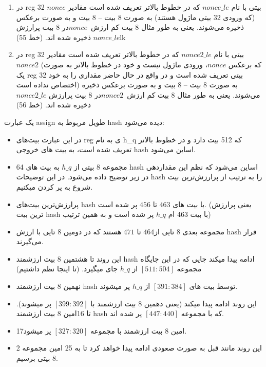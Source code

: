 \begin{enumerate}
	\item در reg 32 بیتی با نام $nonce\_le$ که در خطوط بالاتر تعریف شده است مقادیر $nonce$ (که ورودی 32 بیتی ماژول هستند) به صورت 8 بیت – 8 بیت و به صورت برعکس ذخیره می‌شوند. یعنی به طور مثال 8 بیت کم ارزش\  $nonce$در 8 بیت پرارزش $nonce\_le$ ذخیره شده اند. (خط 55)lk
	      
	\item در reg 32 بیتی با نام $nonce2\_le$ که در خطوط بالاتر تعریف شده است مقادیر $nonce2$ (که برعکس $nonce$، ورودی ماژول نیست و خود در خطوط بالاتر به صورت یک reg 32 بیتی تعریف شده است و در واقع در حال حاضر مقداری را به خود اختصاص نداده است) به صورت 8 بیت – 8 بیت و به صورت برعکس ذخیره می‌شوند. یعنی به طور مثال 8 بیت کم ارزش\  $nonce2$در 8 بیت پرارزش  $nonce2\_le$ ذخیره شده اند. (خط 56)
\end{enumerate}

یک عبارت assign طویل مربوط به hash دیده می‌شود:

\begin{itemize}
	\item
	      در این عبارت بیت‌های reg ی به نام
	      h\_q 
	      که 512 بیت دارد و در خطوط بالاتر تعریف شده است، به بیت های خروجی hash اساین می‌شود.
	\item
	      64 مجموعه 8 بیتی از $h\_q$ به بیت های hash اساین می‌شود که نظم این مقداردهی در زیر توضیح داده می‌شود. در این توضیحات hash را به ترتیب از پرارزش‌ترین بیت شروع به پر کردن میکنیم.
	\item
	      پرارزش‌ترین بیت‌های hash با بیت های $463$ تا $456$ پر شده است. (یعنی پرارزش ترین بیت hash با بیت $463$ ام $h\_q$ پر شده است و به همین ترتیب)
	\item
	      مجموعه بعدی 8 تایی از$464$ تا $471$ هستند که در دومین 8 تایی با ارزش hash قرار می‌گیرند.
	\item
	      این روند تا هشتمین 8 بیت ارزشمند hash ادامه پیدا میکند جایی که در این جایگاه مجموعه $[511:504]$ از $h\_q$ جای میگیرد. (تا اینجا نظم داشتیم)
	\item
	      نهمین 8 بیت ارزشمند hash توسط بیت های $[391:384]$ از $h\_q$ پر میشوند.
	\item
	      این روند ادامه پیدا میکند (یعنی دهمین 8 بیت ارزشمند با $[399:392]$ پر میشوند).
	      تا 16امین 8 بیت ارزشمند hash که با مجموعه $[447:440]$ پر شده اند.
	\item
	      17امین 8 بیت ارزشمند با مجموعه $[327:320]$ پر میشود.
	\item2
	      این روند مانند قبل به صورت صعودی ادامه پیدا خواهد کرد تا به 25 امین مجموعه 8 بیتی برسیم.
	      
\end{itemize}

